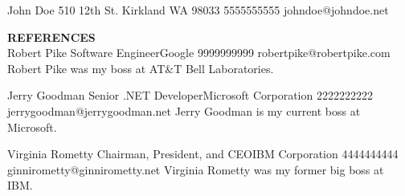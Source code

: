 \documentclass[12pt,letterpaper]{article}
\newcommand{\bigtitle}[1]{\textbf{\MakeUppercase{#1}} \\}
\begin{document}
  {John Doe}
  {510 12th St.}
  {Kirkland}
  {WA 98033}
  {5555555555}
  {johndoe@johndoe.net}

\bigtitle{References}

  {Robert Pike}
  {Software Engineer}{Google}
  {9999999999}
  {robertpike@robertpike.com}
  {Robert Pike was my boss at AT\&T Bell Laboratories.}

  {Jerry Goodman}
  {Senior .NET Developer}{Microsoft Corporation}
  {2222222222}
  {jerrygoodman@jerrygoodman.net}
  {Jerry Goodman is my current boss at Microsoft.}

  {Virginia Rometty}
  {Chairman, President, and CEO}{IBM Corporation}
  {4444444444}
  {ginnirometty@ginnirometty.net}
  {Virginia Rometty was my former big boss at IBM.}
\end{document}

